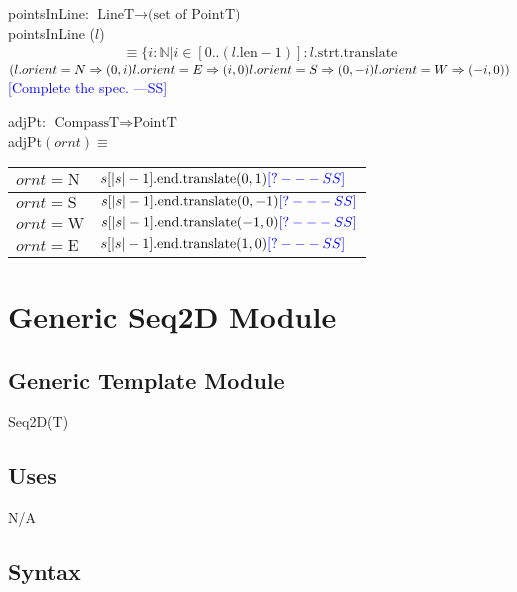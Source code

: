\documentclass[12pt]{article}
\newcommand{\authornote}[3]{\textcolor{#1}{[#3 ---#2]}}
\newcommand{\authornote}[3]{}
\newcommand{\wss}[1]{\authornote{blue}{SS}{#1}}
\begin{document}
pointsInLine: $\mbox{LineT} \rightarrow \mbox{(set of PointT)}$\\

\noindent pointsInLine ($l$) 
\begin{multline*}
\equiv \{ i: \mathbb{N} | i \in [0
  .. (l.\mbox{len} - 1)] : l.\mbox{strt}.\mbox{translate}
\end{multline*} $(l.orient = N \Rightarrow (0,i)\\
				l.orient = E \Rightarrow (i,0)\\
				l.orient = S \Rightarrow (0,- i)\\
				l.orient = W \Rightarrow (-i,0))$
\wss{Complete the spec.}

\noindent adjPt: $\mbox{CompassT} \Rightarrow \mbox{PointT}$\\
adjPt$(ornt) \equiv$

\medskip

\begin{tabular}{|l|l|}
\hline
$ornt = \mbox{N}$ & $s[|s|-1].\mbox{end}.\mbox{translate}(0,1)\wss{?}$\\
\hline
$ornt = \mbox{S}$ & $s[|s|-1].\mbox{end}.\mbox{translate}(0,-1)\wss{?}$\\
\hline
$ornt = \mbox{W}$ & $s[|s|-1].\mbox{end}.\mbox{translate}(-1,0)\wss{?}$\\
\hline
$ornt = \mbox{E}$ & $s[|s|-1].\mbox{end}.\mbox{translate}(1,0)\wss{?}$\\
\hline
\end{tabular}

\newpage

\section* {Generic Seq2D Module}

\subsection* {Generic Template Module}

Seq2D(T)

\subsection* {Uses}

N/A

\subsection* {Syntax}
\end{document}
